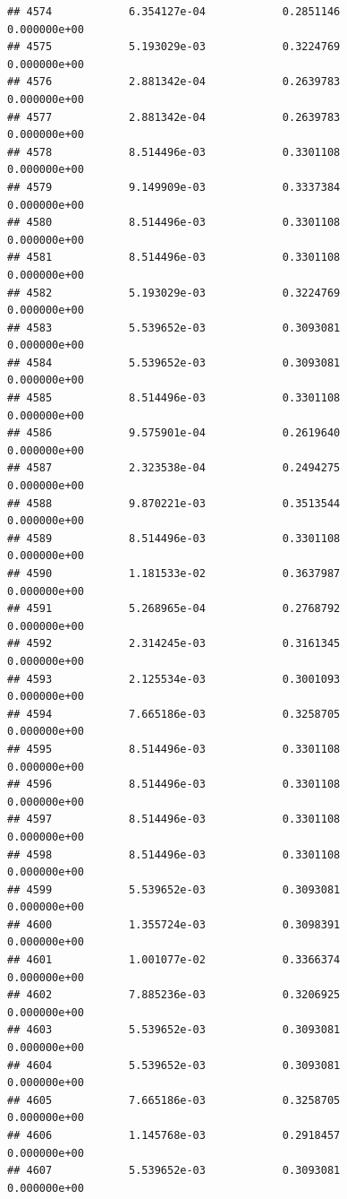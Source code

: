 \documentclass[
]{article}
\begin{document}
\begin{verbatim}
## 4574            6.354127e-04            0.2851146            0.000000e+00
## 4575            5.193029e-03            0.3224769            0.000000e+00
## 4576            2.881342e-04            0.2639783            0.000000e+00
## 4577            2.881342e-04            0.2639783            0.000000e+00
## 4578            8.514496e-03            0.3301108            0.000000e+00
## 4579            9.149909e-03            0.3337384            0.000000e+00
## 4580            8.514496e-03            0.3301108            0.000000e+00
## 4581            8.514496e-03            0.3301108            0.000000e+00
## 4582            5.193029e-03            0.3224769            0.000000e+00
## 4583            5.539652e-03            0.3093081            0.000000e+00
## 4584            5.539652e-03            0.3093081            0.000000e+00
## 4585            8.514496e-03            0.3301108            0.000000e+00
## 4586            9.575901e-04            0.2619640            0.000000e+00
## 4587            2.323538e-04            0.2494275            0.000000e+00
## 4588            9.870221e-03            0.3513544            0.000000e+00
## 4589            8.514496e-03            0.3301108            0.000000e+00
## 4590            1.181533e-02            0.3637987            0.000000e+00
## 4591            5.268965e-04            0.2768792            0.000000e+00
## 4592            2.314245e-03            0.3161345            0.000000e+00
## 4593            2.125534e-03            0.3001093            0.000000e+00
## 4594            7.665186e-03            0.3258705            0.000000e+00
## 4595            8.514496e-03            0.3301108            0.000000e+00
## 4596            8.514496e-03            0.3301108            0.000000e+00
## 4597            8.514496e-03            0.3301108            0.000000e+00
## 4598            8.514496e-03            0.3301108            0.000000e+00
## 4599            5.539652e-03            0.3093081            0.000000e+00
## 4600            1.355724e-03            0.3098391            0.000000e+00
## 4601            1.001077e-02            0.3366374            0.000000e+00
## 4602            7.885236e-03            0.3206925            0.000000e+00
## 4603            5.539652e-03            0.3093081            0.000000e+00
## 4604            5.539652e-03            0.3093081            0.000000e+00
## 4605            7.665186e-03            0.3258705            0.000000e+00
## 4606            1.145768e-03            0.2918457            0.000000e+00
## 4607            5.539652e-03            0.3093081            0.000000e+00

\end{verbatim}
\end{document}
